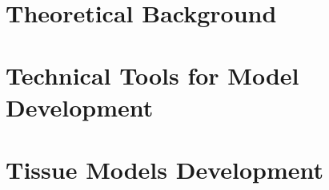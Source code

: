 \documentclass[12pt,a4paper]{report}
\begin{document}
    
    \newpage \ \newpage

    
    \clearpage

    \renewcommand{\contentsname}{Table of Contents}
    \renewcommand\cftchapafterpnum{\par\addvspace{6pt}}
    \renewcommand\cftsecafterpnum{\par\addvspace{4pt}}
    \tableofcontents{}
    \newpage \ \newpage

    
    \newpage \ \newpage

    \chapter{Theoretical Background}
        
        
        \clearpage
        
        \clearpage
        
        \clearpage
        
        \clearpage

    \chapter{Technical Tools for Model Development} \label{sec:tech_tool}
        
        
        \clearpage

    \chapter{Tissue Models Development} \label{sec:models}
        
        
        \clearpage
        
        \clearpage

    
    \clearpage

    
\end{document}
